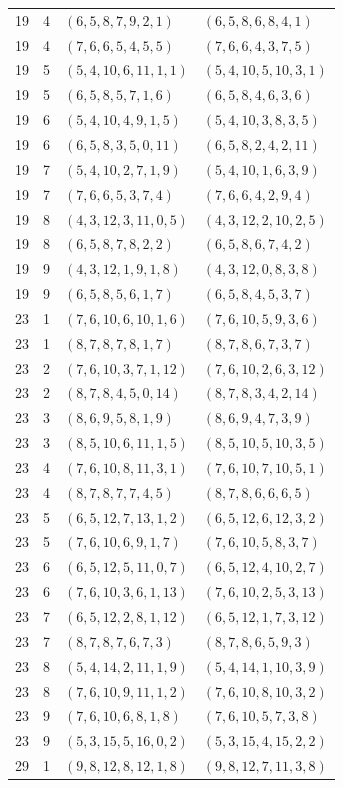\begin{longtable}{rrll}
19&4&$(6,5,8,7,9,2,1)$&$(6,5,8,6,8,4,1)$\\
19&4&$(7,6,6,5,4,5,5)$&$(7,6,6,4,3,7,5)$\\
19&5&$(5,4,10,6,11,1,1)$&$(5,4,10,5,10,3,1)$\\
19&5&$(6,5,8,5,7,1,6)$&$(6,5,8,4,6,3,6)$\\
19&6&$(5,4,10,4,9,1,5)$&$(5,4,10,3,8,3,5)$\\
19&6&$(6,5,8,3,5,0,11)$&$(6,5,8,2,4,2,11)$\\
19&7&$(5,4,10,2,7,1,9)$&$(5,4,10,1,6,3,9)$\\
19&7&$(7,6,6,5,3,7,4)$&$(7,6,6,4,2,9,4)$\\
19&8&$(4,3,12,3,11,0,5)$&$(4,3,12,2,10,2,5)$\\
19&8&$(6,5,8,7,8,2,2)$&$(6,5,8,6,7,4,2)$\\
19&9&$(4,3,12,1,9,1,8)$&$(4,3,12,0,8,3,8)$\\
19&9&$(6,5,8,5,6,1,7)$&$(6,5,8,4,5,3,7)$\\
23&1&$(7,6,10,6,10,1,6)$&$(7,6,10,5,9,3,6)$\\
23&1&$(8,7,8,7,8,1,7)$&$(8,7,8,6,7,3,7)$\\
23&2&$(7,6,10,3,7,1,12)$&$(7,6,10,2,6,3,12)$\\
23&2&$(8,7,8,4,5,0,14)$&$(8,7,8,3,4,2,14)$\\
23&3&$(8,6,9,5,8,1,9)$&$(8,6,9,4,7,3,9)$\\
23&3&$(8,5,10,6,11,1,5)$&$(8,5,10,5,10,3,5)$\\
23&4&$(7,6,10,8,11,3,1)$&$(7,6,10,7,10,5,1)$\\
23&4&$(8,7,8,7,7,4,5)$&$(8,7,8,6,6,6,5)$\\
23&5&$(6,5,12,7,13,1,2)$&$(6,5,12,6,12,3,2)$\\
23&5&$(7,6,10,6,9,1,7)$&$(7,6,10,5,8,3,7)$\\
23&6&$(6,5,12,5,11,0,7)$&$(6,5,12,4,10,2,7)$\\
23&6&$(7,6,10,3,6,1,13)$&$(7,6,10,2,5,3,13)$\\
23&7&$(6,5,12,2,8,1,12)$&$(6,5,12,1,7,3,12)$\\
23&7&$(8,7,8,7,6,7,3)$&$(8,7,8,6,5,9,3)$\\
23&8&$(5,4,14,2,11,1,9)$&$(5,4,14,1,10,3,9)$\\
23&8&$(7,6,10,9,11,1,2)$&$(7,6,10,8,10,3,2)$\\
23&9&$(7,6,10,6,8,1,8)$&$(7,6,10,5,7,3,8)$\\
23&9&$(5,3,15,5,16,0,2)$&$(5,3,15,4,15,2,2)$\\
29&1&$(9,8,12,8,12,1,8)$&$(9,8,12,7,11,3,8)$\\

\end{longtable}
